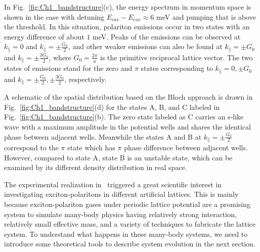 In Fig.~\ref{fig:Ch1_bandstructure}(c), the energy spectrum in momentum space is shown in the case with detuning $E_{cav}-E_{exc}\approx 6$ meV and pumping that is above the threshold.
In this situation, polariton emissions occur in two states with an energy difference of about $1$ meV.
Peaks of the emissions can be observed at $k_\parallel=0$ and $k_\parallel= \pm \frac{G_0}{2}$, and other weaker emissions can also be found at $k_\parallel = \pm G_0$ and $k_\parallel= \pm \frac{3G_0}{2}$, where $G_0=\frac{2\pi}{a}$ is the primitive reciprocal lattice vector.
The two states of emissions stand for the zero and $\pi$ states corresponding to $k_\parallel = 0,\pm G_0$ and $k_\parallel = \pm \frac{G_0}{2},\pm \frac{3G_0}{2}$, respectively.

A schematic of the spatial distribution based on the Bloch approach is drawn in Fig.~\ref{fig:Ch1_bandstructure}(d) for the states A, B, and C labeled in Fig.~\ref{fig:Ch1_bandstructure}(b).
The zero state labeled as C carries an s-like wave with a maximum amplitude in the potential wells and shares the identical phase between adjacent wells.
Meanwhile the states A and B at $k_\parallel=\pm \frac{G_0}{2}$ correspond to the $\pi$ state which has $\pi$ phase difference between adjacent wells.
However, compared to state A, state B is an unstable state, which can be examined by its different density distribution in real space.

The experimental realization in~\cite{Lai:2007aa} triggered a great scientific interest in investigating exciton-polaritons in different artificial lattices.
This is mainly because exciton-polariton gases under periodic lattice potential are a promising system to simulate many-body physics having relatively strong interaction, relatively small effective mass, and a variety of techniques to fabricate the lattice system.
To understand what happens in these many-body systems, we need to introduce some theoretical tools to describe system evolution in the next section.


